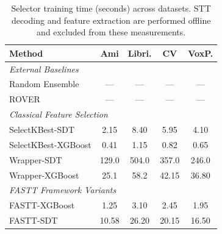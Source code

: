 \begin{table}[t]
    \centering
    \caption{Selector training time (seconds) across datasets. STT decoding and feature
    extraction are performed offline and excluded from these measurements.}
    \label{tab:cv_fit_time} \small
    \begin{tabular}{lcccc}
        \toprule \textbf{Method}                                         & Ami     & Libri.  & CV      & VoxP.  \\
        \midrule \multicolumn{5}{l}{\textit{External Baselines}}          \\
        Random Ensemble                                                  & ---     & ---     & ---     & ---     \\
        ROVER                                                            & ---     & ---     & ---     & ---     \\
        \midrule \multicolumn{5}{l}{\textit{Classical Feature Selection}} \\
        SelectKBest-SDT                                                  & 2.15  & 8.40  & 5.95  & 4.10  \\
        SelectKBest-XGBoost                                              & 0.41 & 1.15  & 0.82  & 0.65  \\
        Wrapper-SDT                                                      & 129.0& 504.0& 357.0& 246.0\\
        Wrapper-XGBoost                                                  & 25.1 & 58.2 & 42.15  & 36.80 \\
        \midrule \multicolumn{5}{l}{\textit{FASTT Framework Variants}}    \\
        FASTT-XGBoost                                                    & 1.25  & 3.10  & 2.45 & 1.95  \\
        FASTT-SDT                                               & 10.58& 26.20& {20.15}& {16.50}\\
        \bottomrule
    \end{tabular}
\end{table}
